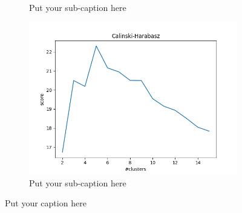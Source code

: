 \documentclass{article}
\begin{document}
\begin{figure}[ht]
\begin{subfigure}{.33\textwidth}
  \caption{Put your sub-caption here}
  \label{fig:sub-second}
\end{subfigure}
\begin{subfigure}{.33\textwidth}
  \centering
  \includegraphics[width=1\linewidth]{1d/Cats/Calinski cats.png}  
  \caption{Put your sub-caption here}
  \label{fig:sub-second}
\end{subfigure}
\caption{Put your caption here}
\label{LabelOverlap}
\end{figure}
\end{document}
